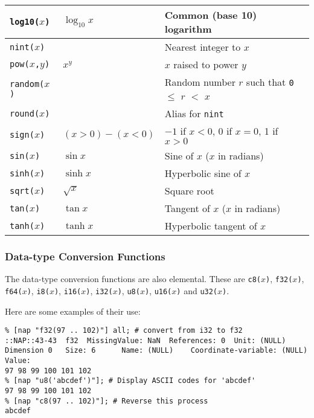 \begin{tabular}{|l|l|l|}
      \hline 
        \texttt{log10(}$x$\texttt{)} & $\log_{10} x$ & Common (base 10) logarithm 
      \\
      \hline 
        \texttt{nint(}$x$\texttt{)} & & Nearest integer to $x$
      \\
      \hline 
        \texttt{pow(}$x$\texttt{,}$y$\texttt{)} & $x^y$ & $x$ raised to power $y$
      \\
      \hline 
        \texttt{random(}$x$\texttt{)} & & Random number $r$ such that \texttt{0} $\le$ $r$ $<$ $x$
      \\
      \hline 
        \texttt{round(}$x$\texttt{)} & & Alias for \texttt{nint}
      \\
      \hline 
        \texttt{sign(}$x$\texttt{)} & $(x>0)-(x<0)$ & $-1$ if $x<0$, 0 if $x=0$, 1 if $x>0$
      \\
      \hline 
        \texttt{sin(}$x$\texttt{)} & $\sin x$ & Sine of $x$ ($x$ in radians)
      \\
      \hline 
        \texttt{sinh(}$x$\texttt{)} & $\sinh x$ & Hyperbolic sine of $x$
      \\
      \hline 
        \texttt{sqrt(}$x$\texttt{)} & $\sqrt x$ & Square root
      \\
      \hline 
        \texttt{tan(}$x$\texttt{)} & $\tan x$ & Tangent of $x$ ($x$ in radians)
      \\
      \hline 
        \texttt{tanh(}$x$\texttt{)} & $\tanh x$ & Hyperbolic tangent of $x$
      \\
  \hline
\end{tabular}

\subsubsection{Data-type Conversion Functions}
\label{Data-type-Conversion-Functions}

The data-type conversion functions are also elemental.
These are
\texttt{c8(}$x$\texttt{)},
\texttt{f32(}$x$\texttt{)},
\texttt{f64(}$x$\texttt{)},
\texttt{i8(}$x$\texttt{)},
\texttt{i16(}$x$\texttt{)},
\texttt{i32(}$x$\texttt{)},
\texttt{u8(}$x$\texttt{)},
\texttt{u16(}$x$\texttt{)} and
\texttt{u32(}$x$\texttt{)}.

Here are some examples of their use:
  \begin{verbatim}
% [nap "f32(97 .. 102)"] all; # convert from i32 to f32
::NAP::43-43  f32  MissingValue: NaN  References: 0  Unit: (NULL)
Dimension 0   Size: 6      Name: (NULL)    Coordinate-variable: (NULL)
Value:
97 98 99 100 101 102
% [nap "u8('abcdef')"]; # Display ASCII codes for 'abcdef'
97 98 99 100 101 102
% [nap "c8(97 .. 102)"]; # Reverse this process
abcdef
\end{verbatim}

